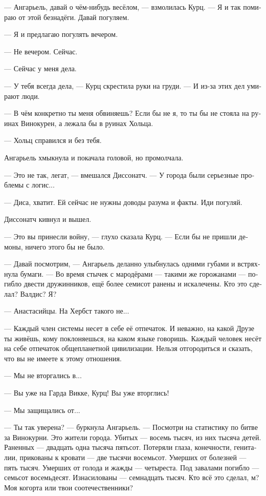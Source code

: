 \documentclass[a4paper,12pt,fleqn]{book}\usepackage{cooltooltips}\usepackage{polyglossia}\setdefaultlanguage[babelshorthands=true]{russian}\setotherlanguage{english}\defaultfontfeatures{Ligatures=TeX,Mapping=tex-text} \usepackage{xcolor}\definecolor{lightgray}{HTML}{bbbbbb}\color{lightgray}\newcommand{\ml}[3]{\textenglish{\textcolor{black}{#3}}}
\newcommand{\asterism}{\vspace{1em}{\centering\Large\bfseries$\ast~\ast~\ast$\par}\vspace{1em}}
\begin{document}
--- Ангарьель, давай о чём-нибудь весёлом, --- взмолилась Курц.
--- Я и так помираю от этой безнадёги.
Давай погуляем.

--- Я и предлагаю погулять вечером.

--- Не вечером.
Сейчас.

--- Сейчас у меня дела.

--- У тебя всегда дела, --- Курц скрестила руки на груди.
--- И из-за этих дел умирают люди.

--- В чём конкретно ты меня обвиняешь?
Если бы не я, то ты бы не стояла на руинах Винокурен, а лежала бы в руинах Хольца.

--- Хольц справился и без тебя.

Ангарьель хмыкнула и покачала головой, но промолчала.

--- Это не так, легат, --- вмешался Диссонатч.
--- У города были серьезные проблемы с логис...

--- Диса, хватит.
Ей сейчас не нужны доводы разума и факты.
Иди погуляй.

Диссонатч кивнул и вышел.

\asterism

--- Это вы принесли войну, --- глухо сказала Курц.
--- Если бы не пришли демоны, ничего этого бы не было.

--- Давай посмотрим, --- Ангарьель деланно улыбнулась одними губами и встряхнула бумаги.
--- Во время стычек с мародёрами --- такими же горожанами --- погибло двести дружинников, ещё более семисот ранены и искалечены.
Кто это сделал?
Валдис?
Я?

--- Анастасийцы.
На Хербст такого не...

--- Каждый член системы несет в себе её отпечаток.
И неважно, на какой Друзе ты живёшь, кому поклоняешься, на каком языке говоришь.
Каждый человек несёт на себе отпечаток общепланетной цивилизации.
Нельзя отгородиться и сказать, что вы не имеете к этому отношения.

--- Мы не вторгались в...

--- Вы уже на Гарда Викке, Курц!
Вы уже вторглись!

--- Мы защищались от...

--- Ты так уверена? --- буркнула Ангарьель.
--- Посмотри на статистику по битве за Винокурни.
Это жители города.
Убитых --- восемь тысяч, из них тысяча детей.
Раненных --- двадцать одна тысяча пятьсот.
Потеряли глаза, конечности, гениталии, прикованы к кровати --- две тысячи восемьсот.
Умерших от болезней --- пять тысяч.
Умерших от голода и жажды --- четыреста.
Под завалами погибло --- семьсот восемьдесят.
Изнасилованы --- семнадцать тысяч.
Кто всё это сделал, м?
Моя когорта или твои соотечественники?
\end{document}
